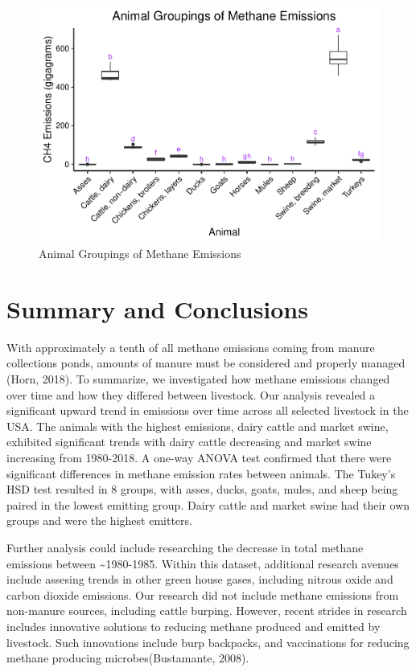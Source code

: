 \documentclass[
  12pt,
]{article}
\begin{document}
\begin{figure}
\centering
\includegraphics{SultzerSwitFinalProject_files/figure-latex/anova results-1.pdf}
\caption{Animal Groupings of Methane Emissions}
\end{figure}

\newpage

\hypertarget{summary-and-conclusions}{%
\section{Summary and Conclusions}\label{summary-and-conclusions}}

With approximately a tenth of all methane emissions coming from manure
collections ponds, amounts of manure must be considered and properly
managed (Horn, 2018). To summarize, we investigated how methane
emissions changed over time and how they differed between livestock. Our
analysis revealed a significant upward trend in emissions over time
across all selected livestock in the USA. The animals with the highest
emissions, dairy cattle and market swine, exhibited significant trends
with dairy cattle decreasing and market swine increasing from 1980-2018.
A one-way ANOVA test confirmed that there were significant differences
in methane emission rates between animals. The Tukey's HSD test resulted
in 8 groups, with asses, ducks, goats, mules, and sheep being paired in
the lowest emitting group. Dairy cattle and market swine had their own
groups and were the highest emitters.

Further analysis could include researching the decrease in total methane
emissions between \textasciitilde1980-1985. Within this dataset,
additional research avenues include assesing trends in other green house
gases, including nitrous oxide and carbon dioxide emissions. Our
research did not include methane emissions from non-manure sources,
including cattle burping. However, recent strides in research includes
innovative solutions to reducing methane produced and emitted by
livestock. Such innovations include burp backpacks, and vaccinations for
reducing methane producing microbes(Bustamante, 2008).
\end{document}
